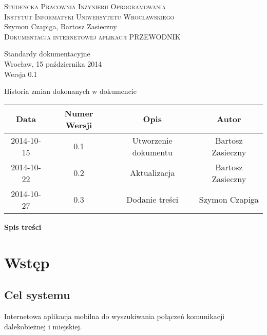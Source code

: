 \documentclass[12pt,a4paper]{report}
\makeatletter
\newcommand*{\toccontents}{\@starttoc{toc}}
\makeatother
\begin{document}
\newcommand{\itab}[1]{\hspace{4em}\rlap{#1}}
\newcommand{\tab}[1]{\hspace{.2\textwidth}\rlap{#1}}

\begin{titlepage}
\begin{center}
\textsc{Studencka Pracownia Inżynierii Oprogramowania}\\[0.5cm]
\textsc{Instytut Informatyki Uniwersytetu Wrocławskiego}\\[7.3cm]

Szymon Czapiga, Bartosz Zasieczny\\[1.0cm]

\LARGE{\textsc{Dokumentacja internetowej  aplikacji PRZEWODNIK}}\\[1.0cm]

\begin{normalsize}
Standardy dokumentacyjne\\[7.0cm]

Wrocław, 15 października 2014\\[0.5cm]
Wersja 0.1
\end{normalsize}
\end{center}
\end{titlepage}

\begin{table}[h1]
 \itab \textit{Tabela 0.} Historia zmian dokonanych w dokumencie
  \begin{center}
    \begin{tabular}{| c | c | c | c |}
    \hline
    Data & Numer Wersji & Opis & Autor \\
    \hline \hline
    2014-10-15 & 0.1 & Utworzenie dokumentu & Bartosz Zasieczny \\
    \hline
    2014-10-22 & 0.2 & Aktualizacja & Bartosz Zasieczny \\
    \hline
    2014-10-27 & 0.3 & Dodanie treści  & Szymon Czapiga \\
    \hline
    \end{tabular}
  \end{center}
\end{table}
\textbf{\large{Spis treści}}\\[0.3cm]
\toccontents
\newpage
\section{Wstęp}
\subsection{Cel systemu}
	Internetowa aplikacja mobilna do wyszukiwania połączeń komunikacji dalekobieżnej i miejskiej.
\end{document}
